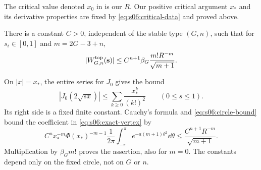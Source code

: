 \begin{rmk}
The critical value denoted $x_0$ in
\cite[\S 6, (17) and Proof~6.3]{MaZ00} is our $R$.
Our positive critical argument $x_*$ and its derivative properties
are fixed by \eqref{eq:s06:critical-data} and proved above.
\end{rmk}

\begin{lmm}\label{lmm:s06:vertex-bound}
There is a constant $C>0$, independent of the stable type $(G,n)$,
such that for $s_i\in[0,1]$ and $m=2G-3+n$,
\begin{equation}\label{eq:s06:vertex-bound}
 |W^{\rm top}_{G,n}(\mathbf s)|
 \leq C^{n+1}\beta_G\frac{m!R^{-m}}{\sqrt{m+1}}.
\end{equation}
\end{lmm}
\begin{prf}
On $|x|=x_*$, the entire series for $J_0$ gives the bound
\[
 |J_0(2\sqrt{s x})|
 \leq\sum_{k\geq0}\frac{x_*^k}{(k!)^2}
 \qquad(0\leq s\leq1).
\]
Its right side is a fixed finite constant. Cauchy's formula and
\eqref{eq:s06:circle-bound} bound the coefficient in
\eqref{eq:s06:exact-vertex} by
\[
 C^n x_*^{-m}\Phi(x_*)^{-m-1}
 \frac1{2\pi}\int_{-\pi}^{\pi}e^{-a(m+1)\theta^2}\dd\theta
 \leq\frac{C^{n+1}R^{-m}}{\sqrt{m+1}}.
\]
Multiplication by $\beta_Gm!$ proves the assertion, also for $m=0$.
The constants depend only on the fixed circle, not on $G$ or $n$.
\end{prf}
